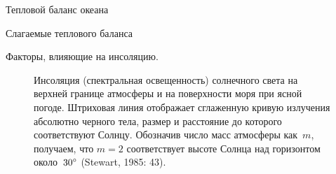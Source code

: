 \begin{chapter}{Тепловой баланс океана}
\begin{section}{Слагаемые теплового баланса}
\begin{paragraph}{Факторы, влияющие на инсоляцию.}
\begin{figure}[t!]
\caption{Инсоляция (спектральная освещенность) солнечного света на верхней
границе атмосферы и на поверхности моря при ясной погоде. Штриховая линия
отображает сглаженную кривую излучения абсолютно черного тела, размер и
расстояние до которого соответствуют Солнцу. Обозначив число масс атмосферы
как~$m$, получаем, что $m = 2$ соответствует высоте Солнца над горизонтом
около~${30}^\circ$ (Stewart, 1985: 43).}
\label{fig:insolation}
\end{figure}
%


\end{paragraph}
\end{section}
\end{chapter}
